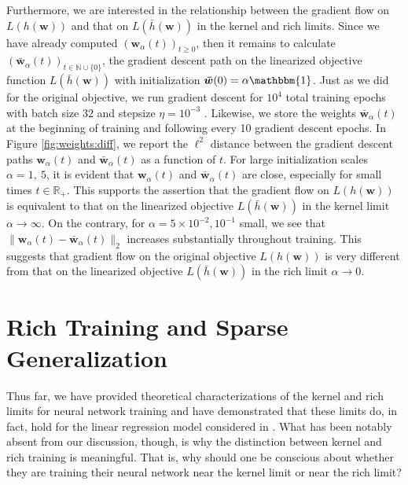 \documentclass{article}
\begin{document}
Furthermore, we are interested in the relationship between the gradient flow on $L(h(\boldsymbol{w}))$ and that on $L(\bar{h}(\boldsymbol{w}))$ in the kernel and rich limits. Since we have already computed $(\boldsymbol{w}_{\alpha}(t))_{t \geq 0}$, then it remains to calculate $(\boldsymbol{\bar{w}}_{\alpha}(t))_{t \in \mathbb{N} \cup \{ 0\}}$, the gradient descent path on the linearized objective function $L(\bar{h}(\boldsymbol{w}))$ with initialization $\boldsymbol{\bar{w}}(0) = \alpha \mathbbm{1}$. Just as we did for the original objective, we run gradient descent for $10^4$ total training epochs with batch size $32$ and stepsize $\eta = 10^{-3}$ . Likewise, we store the weights $\boldsymbol{\bar{w}}_{\alpha}(t)$ at the beginning of training and following every 10 gradient descent epochs. In Figure \ref{fig:weights:diff}, we report the $\ell^2$ distance between the gradient descent paths $\boldsymbol{w}_{\alpha}(t)$ and $\boldsymbol{\bar{w}}_{\alpha}(t)$ as a function of $t$. For large initialization scales $\alpha = 1, \ 5$, it is evident that $\boldsymbol{w}_{\alpha}(t)$ and $\boldsymbol{\bar{w}}_{\alpha}(t)$ are close, especially for small times $t \in \mathbb{R}_+$. This supports the assertion that the gradient flow on $L(h(\boldsymbol{w}))$ is equivalent to that on the linearized objective $L(\bar{h}(\boldsymbol{w}))$ in the kernel limit $\alpha \rightarrow \infty$. On the contrary, for $\alpha = 5 \times 10^{-2}, 10^{-1}$ small, we see that $\| \boldsymbol{w}_{\alpha}(t) - \boldsymbol{\bar{w}}_{\alpha}(t) \|_2$ increases substantially throughout training. This suggests that gradient flow on the original objective $L(h(\boldsymbol{w}))$ is very different from that on the linearized objective $L(\bar{h}(\boldsymbol{w}))$ in the rich limit $\alpha \rightarrow 0$.

\section{Rich Training and Sparse Generalization}\label{richgeneralization}

Thus far, we have provided theoretical characterizations of the kernel and rich limits for neural network training and have demonstrated that these limits do, in fact, hold for the linear regression model considered in \cite{woodworth2020kernel}. What has been notably absent from our discussion, though, is why the distinction between kernel and rich training is meaningful. That is, why should one be conscious about whether they are training their neural network near the kernel limit or near the rich limit? 
\end{document}
